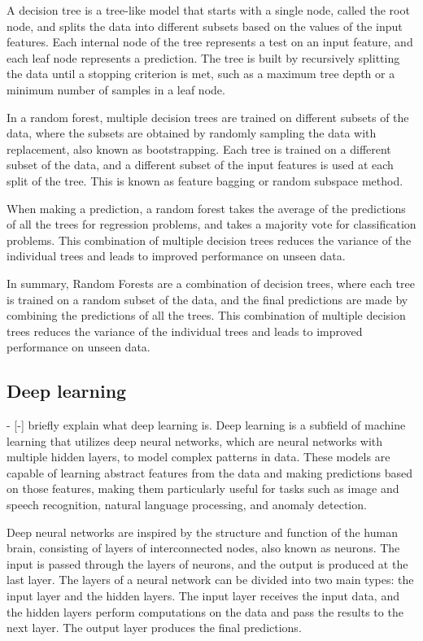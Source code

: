 A decision tree is a tree-like model that starts with a single node, called the root node, and splits the data into different subsets based on the values of the input features. Each internal node of the tree represents a test on an input feature, and each leaf node represents a prediction. The tree is built by recursively splitting the data until a stopping criterion is met, such as a maximum tree depth or a minimum number of samples in a leaf node.

In a random forest, multiple decision trees are trained on different subsets of the data, where the subsets are obtained by randomly sampling the data with replacement, also known as bootstrapping. Each tree is trained on a different subset of the data, and a different subset of the input features is used at each split of the tree. This is known as feature bagging or random subspace method.

When making a prediction, a random forest takes the average of the predictions of all the trees for regression problems, and takes a majority vote for classification problems. This combination of multiple decision trees reduces the variance of the individual trees and leads to improved performance on unseen data.

In summary, Random Forests are a combination of decision trees, where each tree is trained on a random subset of the data, and the final predictions are made by combining the predictions of all the trees. This combination of multiple decision trees reduces the variance of the individual trees and leads to improved performance on unseen data.



\subsection{Deep learning}
- [-] briefly explain what deep learning is.
Deep learning is a subfield of machine learning that utilizes deep neural networks, which are neural networks with multiple hidden layers, to model complex patterns in data. These models are capable of learning abstract features from the data and making predictions based on those features, making them particularly useful for tasks such as image and speech recognition, natural language processing, and anomaly detection.

Deep neural networks are inspired by the structure and function of the human brain, consisting of layers of interconnected nodes, also known as neurons. The input is passed through the layers of neurons, and the output is produced at the last layer. The layers of a neural network can be divided into two main types: the input layer and the hidden layers. The input layer receives the input data, and the hidden layers perform computations on the data and pass the results to the next layer. The output layer produces the final predictions.

